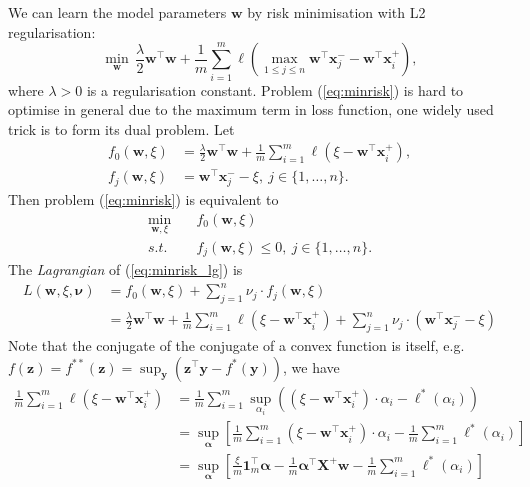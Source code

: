 \documentclass[9pt]{extarticle}
\newcommand{\x}{\mathbf{x}}
\newcommand{\X}{\mathbf{X}}
\newcommand{\y}{\mathbf{y}}
\newcommand{\z}{\mathbf{z}}
\newcommand{\1}{\mathbf{1}}
\newcommand{\w}{\mathbf{w}}
\newcommand{\alphabm}{\bm{\alpha}}
\newcommand{\nubm}{\bm{\nu}}
\newcommand{\eg}{e.g.\ }
\begin{document}
We can learn the model parameters $\w$ by risk minimisation with L2 regularisation:
\begin{equation}
\label{eq:minrisk}
\min_{\w} \, \frac{\lambda}{2} \w^\top \w + \frac{1}{m} \sum_{i=1}^m \ell\left( \max_{1 \le j \le n} \w^\top \x_j^- - \w^\top \x_i^+ \right),
\end{equation}
where $\lambda > 0$ is a regularisation constant.
Problem (\ref{eq:minrisk}) is hard to optimise in general due to the maximum term in loss function, one widely used trick is to form its dual problem.
Let 
\begin{equation*}
\begin{aligned}
f_0 (\w, \xi) &= \frac{\lambda}{2} \w^\top \w + \frac{1}{m} \sum_{i=1}^m \ell\left( \xi - \w^\top \x_i^+ \right), \\
f_j (\w, \xi) &= \w^\top \x_j^- - \xi, \ j \in \{1,\dots,n\}.
\end{aligned}
\end{equation*}
Then problem (\ref{eq:minrisk}) is equivalent to
\begin{equation}
\label{eq:minrisk_lg}
\begin{aligned}
\min_{\w, \xi} \quad & f_0 (\w, \xi) \\
s.t. \quad & f_j (\w, \xi) \le 0, \ j \in \{1,\dots,n\}.
\end{aligned}
\end{equation}
The \emph{Lagrangian} of (\ref{eq:minrisk_lg}) is
\begin{align*}
L(\w, \xi, \nubm) 
&= f_0 (\w, \xi) + \sum_{j=1}^n \nu_j \cdot f_j(\w, \xi) \\
&= \frac{\lambda}{2} \w^\top \w + \frac{1}{m} \sum_{i=1}^m \ell\left( \xi - \w^\top \x_i^+ \right) + \sum_{j=1}^n \nu_j \cdot \left( \w^\top \x_j^- - \xi \right)
\end{align*}
Note that the conjugate of the conjugate of a convex function is itself, \eg $f(\z) = f^{**}(\z) = \sup_{\y} \left( \z^\top \y - f^*(\y) \right)$, we have
\begin{align*}
\frac{1}{m} \sum_{i=1}^m \ell\left( \xi - \w^\top \x_i^+ \right)
&= \frac{1}{m} \sum_{i=1}^m \sup_{\alpha_i} \left( (\xi - \w^\top \x_i^+) \cdot \alpha_i - \ell^*(\alpha_i) \right) \\
&= \sup_{\alphabm} \left[ \frac{1}{m} \sum_{i=1}^m (\xi - \w^\top \x_i^+) \cdot \alpha_i - \frac{1}{m} \sum_{i=1}^m \ell^*(\alpha_i) \right] \\
&= \sup_{\alphabm} \left[ \frac{\xi}{m} \1_m^\top \alphabm - \frac{1}{m} \alphabm^\top \X^+ \w - \frac{1}{m} \sum_{i=1}^m \ell^*(\alpha_i) \right] \\
\end{align*}
\end{document}
